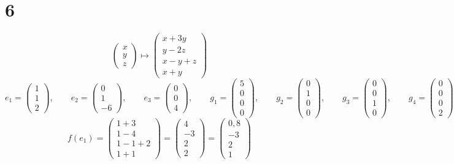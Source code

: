\section{6}

$$
\begin{pmatrix}
	x \\
    y \\
    z
\end{pmatrix} \mapsto
\begin{pmatrix}
	x + 3y \\
    y - 2z \\
    x - y + z \\
    x + y
\end{pmatrix} $$
$$ e_1 =
\begin{pmatrix}
	1 \\
    1 \\
    2
\end{pmatrix}, \qquad e_2 =
\begin{pmatrix}
	0 \\
    1 \\
    -6
\end{pmatrix}, \qquad e_3 =
\begin{pmatrix}
	0 \\
    0 \\
    4
\end{pmatrix}, \qquad g_1 =
\begin{pmatrix}
	5 \\
    0 \\
    0 \\
    0
\end{pmatrix}, \qquad g_2 =
\begin{pmatrix}
	0 \\
    1 \\
    0 \\
    0
\end{pmatrix}, \qquad g_3 =
\begin{pmatrix}
	0 \\
    0 \\
    1 \\
    0
\end{pmatrix}, \qquad g_4 =
\begin{pmatrix}
	0 \\
    0 \\
    0 \\
    2
\end{pmatrix} $$
$$ f(e_1) =
\begin{pmatrix}
	1 + 3 \\
    1 - 4 \\
    1 - 1 + 2 \\
    1 + 1
\end{pmatrix} =
\begin{pmatrix}
	4 \\
    -3 \\
    2 \\
    2
\end{pmatrix} =
\begin{pmatrix}
	0,8 \\
    -3 \\
    2 \\
    1
\end{pmatrix} $$
